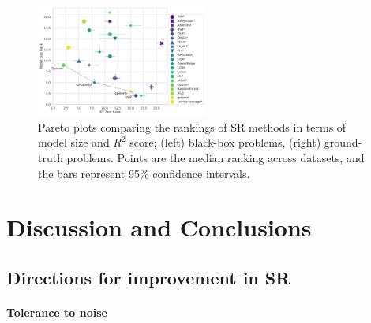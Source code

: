 \begin{figure}
    \centering
    \includegraphics[width=0.5\textwidth]{figs/results_pmlb_r1/pareto_plot_r2_test_rank_model_size_rank.pdf}
    \caption{
        Pareto plots comparing the rankings of SR methods in terms of model size and $R^2$ score; (left) black-box problems, (right) ground-truth problems.
        Points are the median ranking across datasets, and the bars represent 95\% confidence intervals. 
    } \label{fig:pareto}
\end{figure}

\section{Discussion and Conclusions}

\subsection{Directions for improvement in SR}

\paragraph{Tolerance to noise}

